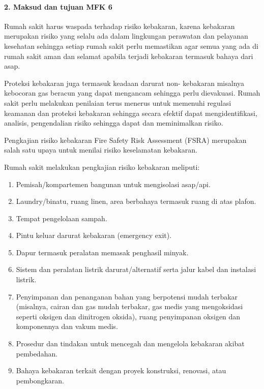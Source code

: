 \documentclass[
]{book}
\providecommand{\tightlist}{%
  \setlength{\itemsep}{0pt}\setlength{\parskip}{0pt}}
\begin{document}
\hypertarget{maksud-dan-tujuan-mfk-6}{%
\paragraph*{2. Maksud dan tujuan MFK 6}\label{maksud-dan-tujuan-mfk-6}}

Rumah sakit harus waspada terhadap risiko kebakaran, karena kebakaran merupakan risiko yang selalu ada dalam lingkungan perawatan dan pelayanan kesehatan sehingga setiap rumah sakit perlu memastikan agar semua yang ada di rumah sakit aman dan selamat apabila terjadi kebakaran termasuk bahaya dari asap.

Proteksi kebakaran juga termasuk keadaan darurat non- kebakaran misalnya kebocoran gas beracun yang dapat mengancam sehingga perlu dievakuasi. Rumah sakit perlu melakukan penilaian terus menerus untuk memenuhi regulasi keamanan dan proteksi kebakaran sehingga secara efektif dapat mengidentifikasi, analisis, pengendalian risiko sehingga dapat dan meminimalkan risiko.

Pengkajian risiko kebakaran Fire Safety Risk Assessment (FSRA) merupakan salah satu upaya untuk menilai risiko keselamatan kebakaran.

Rumah sakit melakukan pengkajian risiko kebakaran meliputi:

\begin{enumerate}
\def\labelenumi{\alph{enumi}.}
\tightlist
\item
  Pemisah/kompartemen bangunan untuk mengisolasi asap/api.
\item
  Laundry/binatu, ruang linen, area berbahaya termasuk ruang di atas plafon.
\item
  Tempat pengelolaan sampah.
\item
  Pintu keluar darurat kebakaran (emergency exit).
\item
  Dapur termasuk peralatan memasak penghasil minyak.
\item
  Sistem dan peralatan listrik darurat/alternatif serta jalur kabel dan instalasi listrik.
\item
  Penyimpanan dan penanganan bahan yang berpotensi mudah terbakar (misalnya, cairan dan gas mudah terbakar, gas medis yang mengoksidasi seperti oksigen dan dinitrogen oksida), ruang penyimpanan oksigen dan komponennya dan vakum medis.
\item
  Prosedur dan tindakan untuk mencegah dan mengelola kebakaran akibat pembedahan.
\item
  Bahaya kebakaran terkait dengan proyek konstruksi, renovasi, atau pembongkaran.
\end{enumerate}
\end{document}
